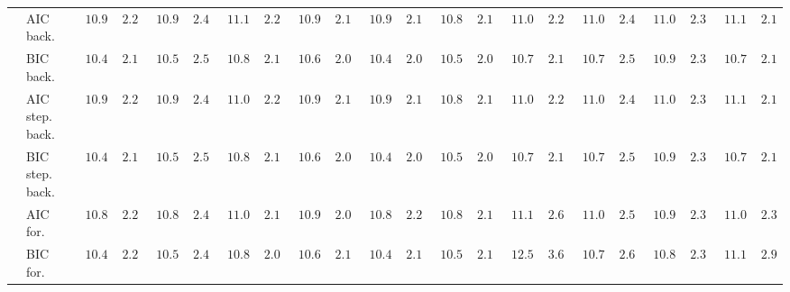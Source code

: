 \begin{tabular}{llllllllllllllllllllll}
	& AIC back.  & $\phantom{0}10.964$ & $\phantom{0}2.239$ & $\phantom{0}10.932$ & $\phantom{0}2.448$ & $\phantom{0}11.113$ & $\phantom{0}2.243$ & $\phantom{0}10.911$ & $\phantom{0}2.117$ & $\phantom{0}10.918$ & $\phantom{0}2.153$ & $\phantom{0}10.878$ & $\phantom{0}2.131$ & $\phantom{0}11.088$ & $\phantom{0}2.282$ & $\phantom{0}11.050$ & $\phantom{0}2.499$ & $\phantom{0}11.046$ & $\phantom{0}2.386$ & $\phantom{0}11.131$ & $\phantom{0}2.176$ \\
	& BIC back.  & $\phantom{0}10.472$ & $\phantom{0}2.190$ & $\phantom{0}10.576$ & $\phantom{0}2.501$ & $\phantom{0}10.877$ & $\phantom{0}2.114$ & $\phantom{0}10.648$ & $\phantom{0}2.065$ & $\phantom{0}10.450$ & $\phantom{0}2.087$ & $\phantom{0}10.562$ & $\phantom{0}2.092$ & $\phantom{0}10.762$ & $\phantom{0}2.189$ & $\phantom{0}10.737$ & $\phantom{0}2.573$ & $\phantom{0}10.916$ & $\phantom{0}2.390$ & $\phantom{0}10.713$ & $\phantom{0}2.142$ \\
	& AIC step. back.  & $\phantom{0}10.964$ & $\phantom{0}2.239$ & $\phantom{0}10.932$ & $\phantom{0}2.448$ & $\phantom{0}11.095$ & $\phantom{0}2.257$ & $\phantom{0}10.911$ & $\phantom{0}2.117$ & $\phantom{0}10.918$ & $\phantom{0}2.153$ & $\phantom{0}10.885$ & $\phantom{0}2.137$ & $\phantom{0}11.072$ & $\phantom{0}2.249$ & $\phantom{0}11.050$ & $\phantom{0}2.499$ & $\phantom{0}11.067$ & $\phantom{0}2.375$ & $\phantom{0}11.131$ & $\phantom{0}2.176$ \\
	& BIC step. back.  & $\phantom{0}10.472$ & $\phantom{0}2.190$ & $\phantom{0}10.576$ & $\phantom{0}2.501$ & $\phantom{0}10.877$ & $\phantom{0}2.114$ & $\phantom{0}10.649$ & $\phantom{0}2.066$ & $\phantom{0}10.450$ & $\phantom{0}2.087$ & $\phantom{0}10.568$ & $\phantom{0}2.090$ & $\phantom{0}10.762$ & $\phantom{0}2.189$ & $\phantom{0}10.737$ & $\phantom{0}2.573$ & $\phantom{0}10.916$ & $\phantom{0}2.390$ & $\phantom{0}10.713$ & $\phantom{0}2.142$ \\
	& AIC for.  & $\phantom{0}10.882$ & $\phantom{0}2.223$ & $\phantom{0}10.874$ & $\phantom{0}2.487$ & $\phantom{0}11.018$ & $\phantom{0}2.153$ & $\phantom{0}10.903$ & $\phantom{0}2.093$ & $\phantom{0}10.831$ & $\phantom{0}2.217$ & $\phantom{0}10.833$ & $\phantom{0}2.183$ & $\phantom{0}11.154$ & $\phantom{0}2.631$ & $\phantom{0}11.010$ & $\phantom{0}2.523$ & $\phantom{0}10.998$ & $\phantom{0}2.333$ & $\phantom{0}11.025$ & $\phantom{0}2.312$ \\
	& BIC for.  & $\phantom{0}10.430$ & $\phantom{0}2.272$ & $\phantom{0}10.569$ & $\phantom{0}2.438$ & $\phantom{0}10.822$ & $\phantom{0}2.084$ & $\phantom{0}10.659$ & $\phantom{0}2.160$ & $\phantom{0}10.434$ & $\phantom{0}2.102$ & $\phantom{0}10.542$ & $\phantom{0}2.120$ & $\phantom{0}12.520$ & $\phantom{0}3.689$ & $\phantom{0}10.759$ & $\phantom{0}2.600$ & $\phantom{0}10.825$ & $\phantom{0}2.313$ & $\phantom{0}11.147$ & $\phantom{0}2.973$ \\

\end{tabular}
